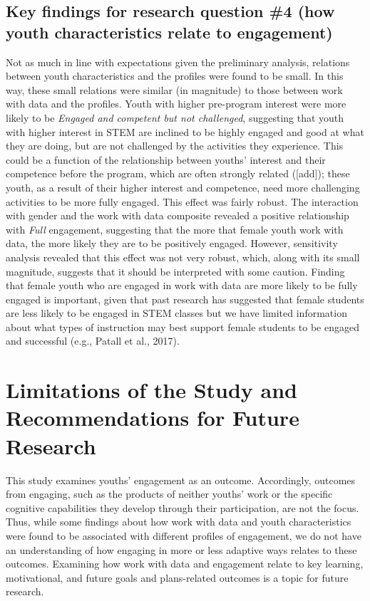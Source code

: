 \documentclass[]{book}
\theoremstyle{definition}
\theoremstyle{definition}
\theoremstyle{definition}
\theoremstyle{remark}
\begin{document}
\subsection{Key findings for research question \#4 (how youth
characteristics relate to
engagement)}\label{key-findings-for-research-question-4-how-youth-characteristics-relate-to-engagement}

Not as much in line with expectations given the preliminary analysis,
relations between youth characteristics and the profiles were found to
be small. In this way, these small relations were similar (in magnitude)
to those between work with data and the profiles. Youth with higher
pre-program interest were more likely to be \emph{Engaged and competent
but not challenged}, suggesting that youth with higher interest in STEM
are inclined to be highly engaged and good at what they are doing, but
are not challenged by the activities they experience. This could be a
function of the relationship between youths' interest and their
competence before the program, which are often strongly related
({[}add{]}); these youth, as a result of their higher interest and
competence, need more challenging activities to be more fully engaged.
This effect was fairly robust. The interaction with gender and the work
with data composite revealed a positive relationship with \emph{Full}
engagement, suggesting that the more that female youth work with data,
the more likely they are to be positively engaged. However, sensitivity
analysis revealed that this effect was not very robust, which, along
with its small magnitude, suggests that it should be interpreted with
some caution. Finding that female youth who are engaged in work with
data are more likely to be fully engaged is important, given that past
research has suggested that female students are less likely to be
engaged in STEM classes but we have limited information about what types
of instruction may best support female students to be engaged and
successful (e.g., Patall et al., 2017).

\section{Limitations of the Study and Recommendations for Future
Research}\label{limitations-of-the-study-and-recommendations-for-future-research}

This study examines youths' engagement as an outcome. Accordingly,
outcomes from engaging, such as the products of neither youths' work or
the specific cognitive capabilities they develop through their
participation, are not the focus. Thus, while some findings about how
work with data and youth characteristics were found to be associated
with different profiles of engagement, we do not have an understanding
of how engaging in more or less adaptive ways relates to these outcomes.
Examining how work with data and engagement relate to key learning,
motivational, and future goals and plans-related outcomes is a topic for
future research.
\end{document}
